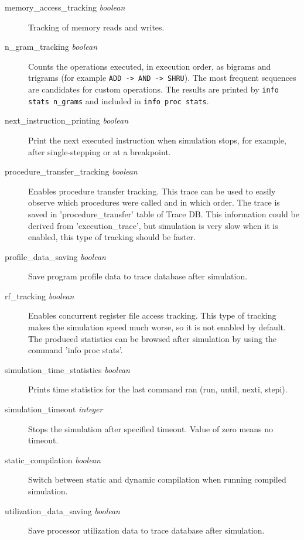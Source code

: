 \documentclass[a4paper,twoside]{tceusermanual}
\begin{document}
\begin{description}
\item[memory\_access\_tracking {\emph{boolean}}]%
 Tracking of memory reads and writes.

\item[n\_gram\_tracking {\emph{boolean}}]%
 Counts the operations executed, in execution order, as bigrams and trigrams
(for example \texttt{ADD -> AND -> SHRU}). The most frequent sequences are
candidates for custom operations. The results are printed by
\texttt{info stats n\_grams} and included in \texttt{info proc stats}.

\item[next\_instruction\_printing {\emph{boolean}}]%
Print the next executed instruction when simulation stops, for example,
after single-stepping or at a breakpoint. 

\item[procedure\_transfer\_tracking {\emph{boolean}}]%
 Enables procedure transfer tracking. This trace can be used to easily
observe which procedures were 
 called and in which order. The trace is saved in 'procedure\_transfer'
table of Trace DB. This information
 could be derived from 'execution\_trace', but simulation is very slow when
it is enabled, this type of
 tracking should be faster.

\item[profile\_data\_saving {\emph{boolean}}]%
Save program profile data to trace database after simulation.

\item[rf\_tracking {\emph{boolean}}]%
 Enables concurrent register file access tracking. This type of tracking
makes the simulation
 speed much worse, so it is not enabled by default. The produced statistics can
be browsed after simulation by using the command 'info proc stats'.

\item[simulation\_time\_statistics {\emph{boolean}}]%
Prints time statistics for the last command ran (run, until, nexti, stepi).

\item[simulation\_timeout {\emph{integer}}]%
Stops the simulation after specified timeout. Value of zero means no timeout.

\item[static\_compilation {\emph{boolean}}]%
Switch between static and dynamic compilation when running compiled simulation. 


\item[utilization\_data\_saving {\emph{boolean}}]%
Save processor utilization data to trace database after simulation.

\end{description}
\end{document}
